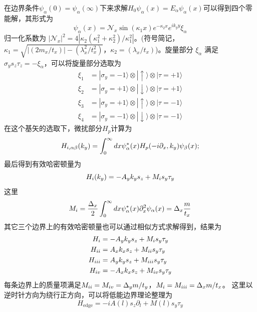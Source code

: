 \qquad 在边界条件$\psi_\alpha(0)=\psi_\alpha(\infty)$下来求解$H_0\psi_\alpha(x)=E_\alpha\psi_\alpha(x)$可以得到四个零能解，其形式为
\begin{equation}
\psi_\alpha(x)=\mathcal{N}_x\sin(\kappa_1x)e^{-\kappa_2x}e^{ik_yy}\xi_\alpha
\end{equation}
归一化系数为 $|\mathcal{N}_x|^2=4|\kappa_2(\kappa_1^2+\kappa_2^2)/\kappa_1^2|$。(符号简记，$\kappa_1=\sqrt{|(2m_x/t_x)|-(\lambda_x^2/t_x^2)}$，$ \kappa_2=(\lambda_x/t_x)$)。旋量部分 $\xi_\alpha$ 满足 $\sigma_ys_z\tau_z=-\xi_\alpha$，可以将旋量部分选取为
\begin{equation}
\begin{aligned}
\xi_1&=|\sigma_y=-1\rangle\otimes|\uparrow\rangle\otimes|\tau=+1\rangle\\
\xi_2&=|\sigma_y=+1\rangle\otimes|\downarrow\rangle\otimes|\tau=+1\rangle\\
\xi_3&=|\sigma_y=+1\rangle\otimes|\uparrow\rangle\otimes|\tau=-1\rangle\\
\xi_4&=|\sigma_y=-1\rangle\otimes|\downarrow\rangle\otimes|\tau=-1\rangle
\end{aligned}
\end{equation}
在这个基矢的选取下，微扰部分$H_p$计算为
\begin{equation}
H_{\uppercase\expandafter{\romannumeral1},\alpha\beta}(k_y)=\int_{0}^{\infty}dx\psi^*_\alpha(x)H_p(-i\partial_x,k_y)\psi_\beta(x);
\end{equation}
最后得到有效哈密顿量为
\begin{equation}
H_{\uppercase\expandafter{\romannumeral1}}(k_y)=-A_yk_ys_z+M_{\uppercase\expandafter{\romannumeral1}}s_y\tau_y
\end{equation}
这里
\begin{equation}
M_{\uppercase\expandafter{\romannumeral1}}=\frac{\Delta_x}{2}\int_{0}^{\infty}dx\psi_\alpha^*(x)\partial_x^2\psi_\alpha(x)=\Delta_x\frac{m}{t_x}
\end{equation}
其它三个边界上的有效哈密顿量也可以通过相似方式求解得到，结果为
\begin{equation}
\begin{aligned}
H_{\uppercase\expandafter{\romannumeral1}}&=-A_yk_ys_z+M_{\uppercase\expandafter{\romannumeral1}}s_y\tau_y\\
H_{\uppercase\expandafter{\romannumeral2}}&=A_xk_xs_z+M_{\uppercase\expandafter{\romannumeral2}}s_y\tau_y\\
H_{\uppercase\expandafter{\romannumeral3}}&=A_yk_ys_z+M_{\uppercase\expandafter{\romannumeral3}}s_y\tau_y\\
H_{\uppercase\expandafter{\romannumeral4}}&=-A_xk_xs_z+M_{\uppercase\expandafter{\romannumeral4}}s_y\tau_y\\\label{edge1}
\end{aligned}
\end{equation}
每条边界上的质量项满足$M_{\uppercase\expandafter{\romannumeral2}}=M_{\uppercase\expandafter{\romannumeral4}}=\Delta_ym/t_y$，$M_{\uppercase\expandafter{\romannumeral1}}=M_{\uppercase\expandafter{\romannumeral3}}=\Delta_xm/t_x$。
这里以逆时针方向为绕行正方向，可以将低能边界理论整理为
\begin{equation}
H_{\mathrm{edge}}=-iA(l)s_z\partial_l+M(l)s_y\tau_y\label{edge2}
\end{equation}

